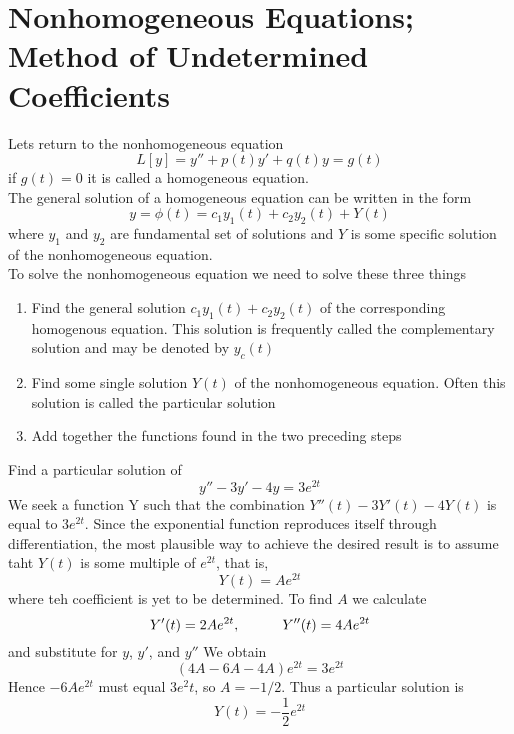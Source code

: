 \section {Nonhomogeneous Equations; Method of Undetermined Coefficients}
Lets return to the nonhomogeneous equation 
\[ L[y] = y'' + p(t)y' + q(t)y  = g(t) \]
if $ g(t) = 0 $ it is called a homogeneous equation.  \\
The general solution of a homogeneous equation can be written in the form 
\[ y = \phi (t) = c_1y_1 (t) + c_2 y_2(t) + Y(t) \]
where $ y_1$ and $ y_2$ are fundamental set of solutions and $ Y $ is some specific solution of the nonhomogeneous equation. \\
To solve the nonhomogeneous equation we need to solve these three things
\begin{enumerate}
	\item Find the general solution $ c_1 y_1 (t) + c_2y_2(t) $ of the corresponding homogenous equation. This solution is frequently called the complementary solution and may be denoted by $ y_c (t) $
	\item Find some single solution $ Y(t) $ of the nonhomogeneous equation. Often this solution is called the particular solution
	\item Add together the functions found in the two preceding steps 
\end{enumerate}
\begin{example}
	Find a particular solution of \[ y'' - 3y' - 4y = 3e^{2t} \]
	We seek a function Y such that the combination $ Y''(t) - 3Y'(t) - 4Y(t) $ is equal to $ 3e^{2t} $. Since the exponential function reproduces itself through differentiation, the most plausible way to achieve the desired result is to assume taht $ Y(t) $ is some multiple of $ e^{2t} $, that is, \[ Y(t) = Ae^{2t} \] where teh coefficient is yet to be determined. To find $ A  $ we calculate \[ Y'(t) = 2Ae^{2t}, \indent \indent  Y''(t) = 4Ae^{2t}\] and substitute for $ y $, $ y' $, and $ y'' $ We obtain \[ (4A - 6A -4 A)e^{2t} = 3e^{2t}\]
	Hence $ -6Ae^{2t} $ must equal $ 3e^2t $, so $ A = -1/2 $. Thus a particular solution is \[ Y(t) = -\dfrac{1}{2} e^{2t} \]
\end{example}
